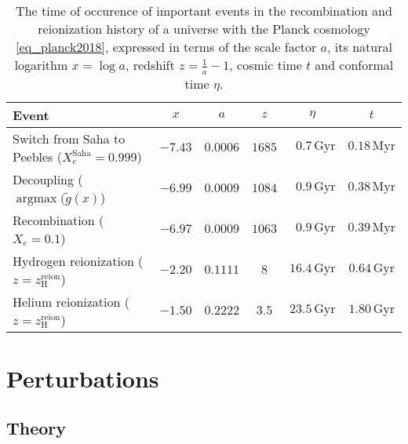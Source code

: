\documentclass[10pt,a4paper]{article}
\DeclareMathOperator{\argmax}{argmax}
\begin{document}
\begin{table}[b]
\centering
\caption{%
	The time of occurence of important events in the recombination and reionization history of a universe with the Planck cosmology \eqref{eq_planck2018},
	expressed in terms of the scale factor $a$, its natural logarithm $x = \log a$, redshift $z = \frac1a - 1$, cosmic time $t$ and conformal time $\eta$.
}
\label{table_times2}
\begin{tabular}{l c c c c c}
	\toprule
	Event                                                               & $x$     & $a$       & $z$    & $\eta$    & $t$ \\
	\midrule
	Switch from Saha to Peebles ($X_e^\text{Saha} = 0.999$) & $-7.43$ & $0.0006$  & $1685$ & $\phantom{0}0.7\,\mathrm{Gyr}$ & $0.18\,\mathrm{Myr}$ \\
	Decoupling ($\argmax(\tilde{g}(x)$)                     & $-6.99$ & $0.0009$  & $1084$ & $\phantom{0}0.9\,\mathrm{Gyr}$ & $0.38\,\mathrm{Myr}$ \\
	Recombination ($X_e = 0.1$)                             & $-6.97$ & $0.0009$  & $1063$ & $\phantom{0}0.9\,\mathrm{Gyr}$ & $0.39\,\mathrm{Myr}$ \\
	Hydrogen reionization ($z = z^\text{reion}_\text{H}$)   & $-2.20$ & $0.1111$  & $8$    & $16.4\,\mathrm{Gyr}$ & $0.64\,\mathrm{Gyr}$ \\
	Helium reionization ($z = z^\text{reion}_\text{H}$)     & $-1.50$ & $0.2222$  & $3.5$  & $23.5\,\mathrm{Gyr}$ & $1.80\,\mathrm{Gyr}$ \\
	\bottomrule
\end{tabular}
\end{table}



\clearpage
\section{Perturbations}

\newcommand\N{\mathcal{N}}
\newcommand\aH{\mathcal{H}}

\subsection{Theory}
\end{document}
